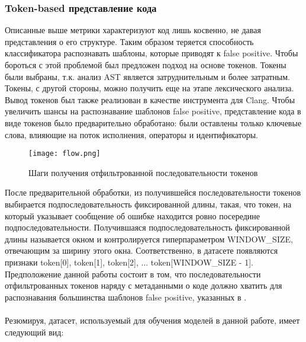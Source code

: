 \subsubsection{Token-based представление кода}
\label{Tokens} 
Описанные выше метрики характеризуют код лишь косвенно, не давая представления о его структуре. Таким образом теряется способность классификатора распознавать шаблоны, которые приводят к false positive. Чтобы бороться с этой проблемой был предложен подход на основе токенов. Токены были выбраны, т.к. анализ AST является затруднительным и более затратным. Токены, с другой стороны, можно получить еще на этапе лексического анализа. Вывод токенов был также реализован в качестве инструмента для Clang. Чтобы увеличить шансы на распознавание шаблонов false positive, представление кода в виде токенов было предварительно обработано: были оставлены только ключевые слова, влияющие на поток исполнения, операторы и идентификаторы.

\begin{figure}[H]
    \centering
    \texttt{[image: flow.png]}
    \caption{Шаги получения отфильтрованной последовательности токенов}
\end{figure}

После предварительной обработки, из получившейся последовательности токенов выбирается подпоследовательность фиксированной длины, такая, что токен, на который указывает сообщение об ошибке находится ровно посередине подпоследовательности. Получившаяся подпоследовательность фиксированной длины называется окном и контролируется гиперпараметром WINDOW\_SIZE, отвечающим за ширину этого окна. Соответственно, в датасете появляются признаки token[0], token[1], token[2], ... token[WINDOW\_SIZE - 1]. Предположение данной работы состоит в том, что последовательности отфильтрованных токенов наряду с метаданными о коде должно хватить для распознавания большинства шаблонов false positive, указанных в \cite{Reynolds}.
\\
\\
Резюмируя, датасет, используемый для обучения моделей в данной работе, имеет следующий вид:

\begin{table}[H]
    \centering
    \caption{Общий вид элемента датасета}
\end{table}

